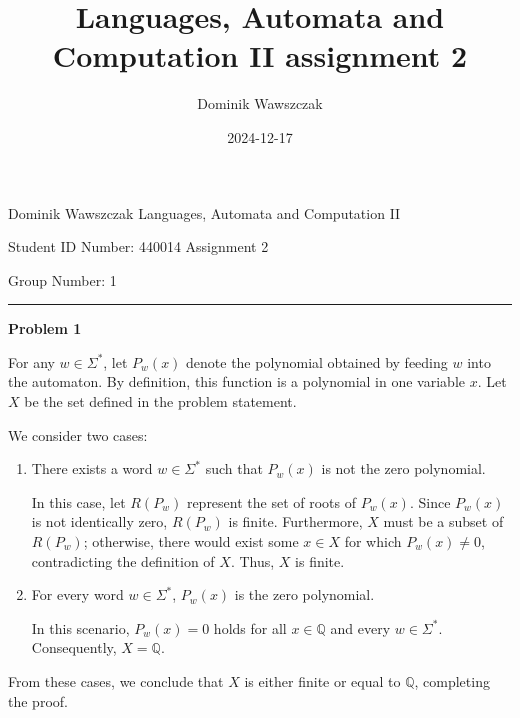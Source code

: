 \documentclass[12pt]{article}
\title{Languages, Automata and Computation II assignment 2}
\author{Dominik Wawszczak}
\date{2024-12-17}
\begin{document}
	\setlength{\parindent}{0 cm}
	
	Dominik Wawszczak \hfill Languages, Automata and Computation II
	
	Student ID Number: 440014 \hfill Assignment 2
	
	Group Number: 1
	
	\bigskip
	\hrule
	\bigskip
	
	\textbf{Problem 1}
	
	\medskip
	
	For any \(w \in \Sigma^{\ast}\), let \(P_{w}(x)\) denote the polynomial
	obtained by feeding \(w\) into the automaton. By definition, this function
	is a polynomial in one variable \(x\). Let \(X\) be the set defined in the
	problem statement.
	
	\medskip
	
	We consider two cases:
	\begin{enumerate}
		\item There exists a word \(w \in \Sigma^{\ast}\) such that \(P_{w}(x)\)
		      is not the zero polynomial.
		      
		      In this case, let \(R(P_{w})\) represent the set of roots of
		      \(P_{w}(x)\). Since \(P_{w}(x)\) is not identically zero,
		      \(R(P_{w})\) is finite. Furthermore, \(X\) must be a subset of
		      \(R(P_{w})\); otherwise, there would exist some \(x \in X\) for
		      which \(P_{w}(x) \neq 0\), contradicting the definition of \(X\).
		      Thus, \(X\) is finite.
		
		\item For every word \(w \in \Sigma^{\ast}\), \(P_{w}(x)\) is the zero
		      polynomial.
		      
		      In this scenario, \(P_{w}(x) = 0\) holds for all \(x \in
		      \mathbb{Q}\) and every \(w \in \Sigma^{\ast}\). Consequently, \(X
		      = \mathbb{Q}\).
	\end{enumerate}
	From these cases, we conclude that \(X\) is either finite or equal to
	\(\mathbb{Q}\), completing the proof.
\end{document}
